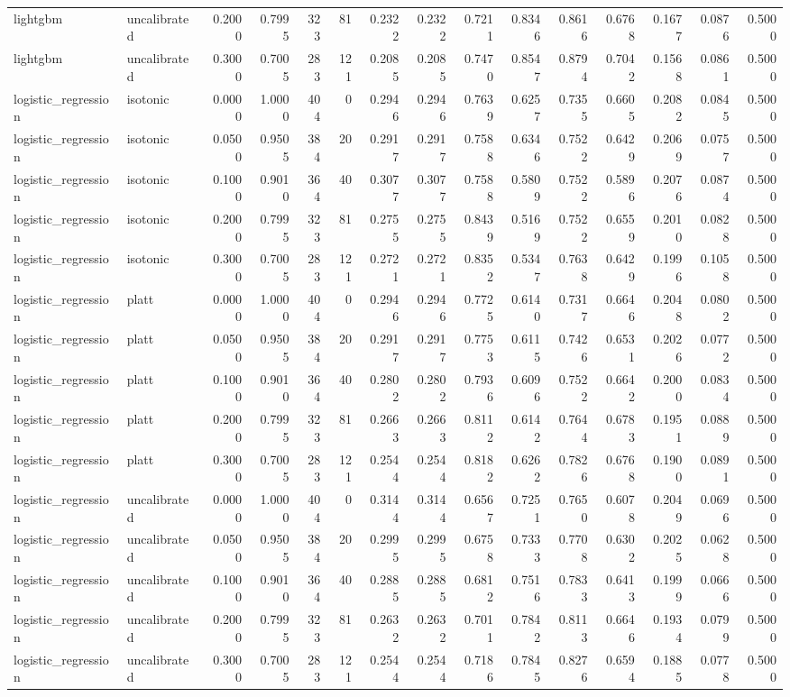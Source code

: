 \begin{table}[htbp]
\begin{tabular}{llrrrrrrrrrrrrr}
lightgbm & uncalibrated & 0.2000 & 0.7995 & 323 & 81 & 0.2322 & 0.2322 & 0.7211 & 0.8346 & 0.8616 & 0.6768 & 0.1677 & 0.0876 & 0.5000 \\
lightgbm & uncalibrated & 0.3000 & 0.7005 & 283 & 121 & 0.2085 & 0.2085 & 0.7470 & 0.8547 & 0.8794 & 0.7042 & 0.1568 & 0.0861 & 0.5000 \\
logistic\_regression & isotonic & 0.0000 & 1.0000 & 404 & 0 & 0.2946 & 0.2946 & 0.7639 & 0.6257 & 0.7355 & 0.6605 & 0.2082 & 0.0845 & 0.5000 \\
logistic\_regression & isotonic & 0.0500 & 0.9505 & 384 & 20 & 0.2917 & 0.2917 & 0.7588 & 0.6346 & 0.7522 & 0.6429 & 0.2069 & 0.0757 & 0.5000 \\
logistic\_regression & isotonic & 0.1000 & 0.9010 & 364 & 40 & 0.3077 & 0.3077 & 0.7588 & 0.5809 & 0.7522 & 0.5896 & 0.2076 & 0.0874 & 0.5000 \\
logistic\_regression & isotonic & 0.2000 & 0.7995 & 323 & 81 & 0.2755 & 0.2755 & 0.8439 & 0.5169 & 0.7522 & 0.6559 & 0.2010 & 0.0828 & 0.5000 \\
logistic\_regression & isotonic & 0.3000 & 0.7005 & 283 & 121 & 0.2721 & 0.2721 & 0.8352 & 0.5347 & 0.7638 & 0.6429 & 0.1996 & 0.1058 & 0.5000 \\
logistic\_regression & platt & 0.0000 & 1.0000 & 404 & 0 & 0.2946 & 0.2946 & 0.7725 & 0.6140 & 0.7317 & 0.6646 & 0.2048 & 0.0802 & 0.5000 \\
logistic\_regression & platt & 0.0500 & 0.9505 & 384 & 20 & 0.2917 & 0.2917 & 0.7753 & 0.6115 & 0.7426 & 0.6531 & 0.2026 & 0.0772 & 0.5000 \\
logistic\_regression & platt & 0.1000 & 0.9010 & 364 & 40 & 0.2802 & 0.2802 & 0.7936 & 0.6096 & 0.7522 & 0.6642 & 0.2000 & 0.0834 & 0.5000 \\
logistic\_regression & platt & 0.2000 & 0.7995 & 323 & 81 & 0.2663 & 0.2663 & 0.8112 & 0.6142 & 0.7644 & 0.6783 & 0.1951 & 0.0889 & 0.5000 \\
logistic\_regression & platt & 0.3000 & 0.7005 & 283 & 121 & 0.2544 & 0.2544 & 0.8182 & 0.6262 & 0.7826 & 0.6768 & 0.1900 & 0.0891 & 0.5000 \\
logistic\_regression & uncalibrated & 0.0000 & 1.0000 & 404 & 0 & 0.3144 & 0.3144 & 0.6567 & 0.7251 & 0.7650 & 0.6078 & 0.2049 & 0.0696 & 0.5000 \\
logistic\_regression & uncalibrated & 0.0500 & 0.9505 & 384 & 20 & 0.2995 & 0.2995 & 0.6758 & 0.7333 & 0.7708 & 0.6302 & 0.2025 & 0.0628 & 0.5000 \\
logistic\_regression & uncalibrated & 0.1000 & 0.9010 & 364 & 40 & 0.2885 & 0.2885 & 0.6812 & 0.7516 & 0.7833 & 0.6413 & 0.1999 & 0.0666 & 0.5000 \\
logistic\_regression & uncalibrated & 0.2000 & 0.7995 & 323 & 81 & 0.2632 & 0.2632 & 0.7011 & 0.7842 & 0.8113 & 0.6646 & 0.1934 & 0.0799 & 0.5000 \\
logistic\_regression & uncalibrated & 0.3000 & 0.7005 & 283 & 121 & 0.2544 & 0.2544 & 0.7186 & 0.7845 & 0.8276 & 0.6594 & 0.1885 & 0.0778 & 0.5000 \\
\bottomrule
\end{tabular}

\end{table}


